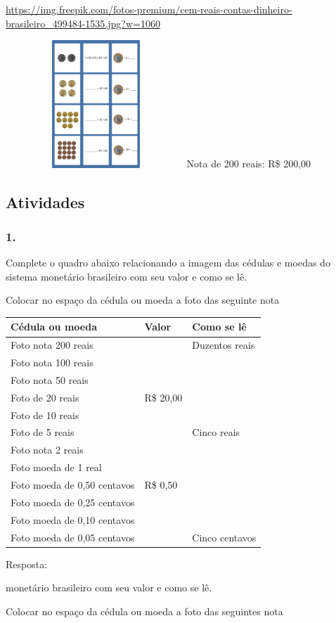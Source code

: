 \url{https://img.freepik.com/fotos-premium/cem-reais-contas-dinheiro-brasileiro_499484-1535.jpg?w=1060}

\includegraphics[width=2.68333in,height=1.88913in]{media/image71.png}Nota
de 200 reais: R\$ 200,00

\subsection{Atividades}\label{atividades-5}

\subsubsection{1.}\label{section-80}

Complete o quadro abaixo relacionando a imagem das cédulas e moedas do
sistema monetário brasileiro com seu valor e como se lê.

Colocar no espaço da cédula ou moeda a foto das seguinte nota

\begin{longtable}[]{@{}lll@{}}
\toprule
Cédula ou moeda & Valor & Como se lê\tabularnewline
\midrule
\endhead
Foto nota 200 reais & & Duzentos reais\tabularnewline
Foto nota 100 reais & &\tabularnewline
Foto nota 50 reais & &\tabularnewline
Foto de 20 reais & R\$ 20,00 &\tabularnewline
Foto de 10 reais & &\tabularnewline
Foto de 5 reais & & Cinco reais\tabularnewline
Foto nota 2 reais & &\tabularnewline
Foto moeda de 1 real & &\tabularnewline
Foto moeda de 0,50 centavos & R\$ 0,50 &\tabularnewline
Foto moeda de 0,25 centavos & &\tabularnewline
Foto moeda de 0,10 centavos & &\tabularnewline
Foto moeda de 0,05 centavos & & Cinco centavos\tabularnewline
\bottomrule
\end{longtable}

Resposta:

monetário brasileiro com seu valor e como se lê.

Colocar no espaço da cédula ou moeda a foto das seguintes nota

